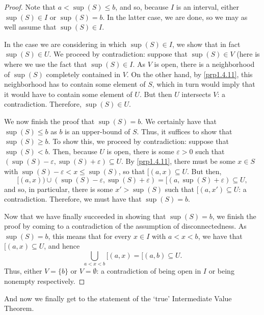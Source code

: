 \begin{thm}
\begin{proof}
Note that $a<\sup (S)\leq b$, and so, because $I$ is an interval, either $\sup (S)\in I$ or $\sup (S)=b$.  In the latter case, we are done, so we may as well assume that $\sup (S)\in I$.

In the case we are considering in which $\sup (S)\in I$, we show that in fact $\sup (S)\in U$.  We proceed by contradiction:  suppose that $\sup (S)\in V$ (here is where we use the fact that $\sup (S)\in I$.  As $V$ is open, there is a neighborhood of $\sup (S)$ completely contained in $V$.  On the other hand, by \cref{prp1.4.11}, this neighborhood has to contain some element of $S$, which in turn would imply that it would have to contain some element of $U$.  But then $U$ intersects $V$:  a contradiction.  Therefore, $\sup (S)\in U$.

We now finish the proof that $\sup (S)=b$.  We certainly have that $\sup (S)\leq b$ as $b$ is an upper-bound of $S$.  Thus, it suffices to show that $\sup (S)\geq b$.  To show this, we proceed by contradiction:  suppose that $\sup (S)<b$.  Then, because $U$ is open, there is some $\varepsilon >0$ such that $(\sup (S)-\varepsilon ,\sup (S)+\varepsilon )\subseteq U$.  By \cref{prp1.4.11}, there must be some $x\in S$ with $\sup (S)-\varepsilon <x\leq \sup (S)$, so that $[(a,x)\subseteq U$.  But then,
\begin{equation}
[(a,x))\cup (\sup (S)-\varepsilon ,\sup (S)+\varepsilon )=[(a,\sup (S)+\varepsilon )\subseteq U,
\end{equation}
and so, in particular, there is some $x'>\sup (S)$ such that $[(a,x')\subseteq U$:  a contradiction.  Therefore, we must have that $\sup (S)=b$.

Now that we have finally succeeded in showing that $\sup (S)=b$, we finish the proof by coming to a contradiction of the assumption of disconnectedness.  As $\sup (S)=b$, this means that for every $x\in I$ with $a<x<b$, we have that $[(a,x)\subseteq U$, and hence
\begin{equation}
\bigcup _{a<x<b}[(a,x)=[(a,b)\subseteq U.
\end{equation}
Thus, either $V=\{ b\}$ or $V=\emptyset$:  a contradiction of being open in $I$ or being nonempty respectively.
\end{proof}
\end{thm}
And now we finally get to the statement of the `true' Intermediate Value Theorem.
